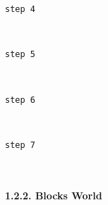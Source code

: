 \documentclass[11pt]{article}
\begin{document}
    \begin{Verbatim}[commandchars=\\\{\}]
step 4

    \end{Verbatim}

    \begin{center}
    \end{center}
    { \hspace*{\fill} \\}
    
    \begin{Verbatim}[commandchars=\\\{\}]
step 5

    \end{Verbatim}

    \begin{center}
    \end{center}
    { \hspace*{\fill} \\}
    
    \begin{Verbatim}[commandchars=\\\{\}]
step 6

    \end{Verbatim}

    \begin{center}
    \end{center}
    { \hspace*{\fill} \\}
    
    \begin{Verbatim}[commandchars=\\\{\}]
step 7

    \end{Verbatim}

    \begin{center}
    \end{center}
    { \hspace*{\fill} \\}
    
    \paragraph{1.2.2. Blocks World}\label{blocks-world}
\end{document}
